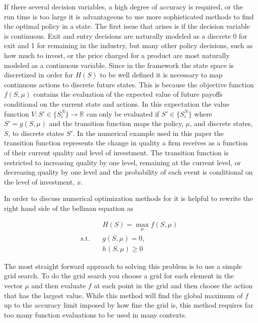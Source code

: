 \documentclass[12pt]{article}
\begin{document}
If there several decision variables, a high degree of accuracy is required, or the run time is too large it is advantageous to use more sophisticated methods to find the optimal policy in a state. The first issue that arises is if the decision variable is continuous. Exit and entry decisions are naturally modeled as a discrete 0 for exit and 1 for remaining in the industry, but many other policy decisions, such as how much to invest, or the price charged for a product are most naturally modeled as a continuous variable. Since in the \citet{1995_Erickson_Pakes_RES} framework the state space is discretized in order for $H(S)$ to be well defined it is necessary to map continuous actions to discrete future states. This is because the objective function $f(S,\mu)$ contains the evaluation of the expected value of future payoffs conditional on the current state and actions. In this expectation the value function $V : S' \in \{S_i^N\} \rightarrow \mathbb{R}$ can only be evaluated if $S' \in \{S_i^N\}$ where $S'=g(S,\mu)$ and the transition function maps the policy, $\mu$, and discrete states, $S$, to discrete states $S'$. In the numerical example used in this paper the transition function represents the change in quality a firm receives as a function of their current quality and level of investment. The transition function is restricted to increasing quality by one level, remaining at the current level, or decreasing quality by one level and the probability of each event is conditional on the level of investment, $x$.

In order to discuss numerical optimization methods for it is helpful to rewrite the right hand side of the bellman equation as

\begin{equation}
  \label{hdef}
  \begin{aligned}
    & H(S)=\max_{\mu} f(S,\mu) \\
    \text{s.t.}\quad & g(S, \mu)=0,\\
    & h(S,\mu) \geq 0
  \end{aligned}
\end{equation}

The most straight forward approach to solving this problem is to use a simple grid search. To do the grid search you choose a grid for each element in the vector $\mu$ and then evaluate $f$ at each point in the grid and then choose the action that has the largest value. While this method will find the global maximum of $f$ up to the accuracy limit imposed by how fine the grid is, this method requires far too many function evaluations to be used in many contexts.
\end{document}
